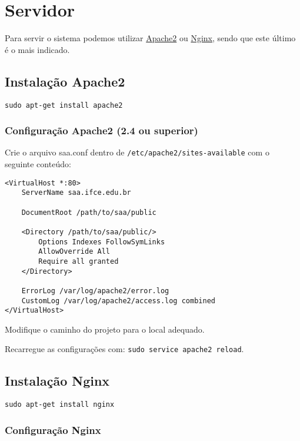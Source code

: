 \section{Servidor}\label{servidor}

Para servir o sistema podemos utilizar
\href{http://httpd.apache.org/}{Apache2} ou
\href{http://nginx.org/}{Nginx}, sendo que este último é o mais
indicado.

\subsection{Instalação Apache2}\label{instalauxe7uxe3o-apache2}

\begin{verbatim}
sudo apt-get install apache2
\end{verbatim}

\subsubsection{Configuração Apache2 (2.4 ou
superior)}\label{configurauxe7uxe3o-apache2-2.4-ou-superior}

Crie o arquivo saa.conf dentro de \texttt{/etc/apache2/sites-available}
com o seguinte conteúdo:

\begin{verbatim}
<VirtualHost *:80>
    ServerName saa.ifce.edu.br

    DocumentRoot /path/to/saa/public

    <Directory /path/to/saa/public/>
        Options Indexes FollowSymLinks
        AllowOverride All
        Require all granted
    </Directory>

    ErrorLog /var/log/apache2/error.log
    CustomLog /var/log/apache2/access.log combined
</VirtualHost>
\end{verbatim}

Modifique o caminho do projeto para o local adequado.

Recarregue as configurações com: \texttt{sudo service apache2 reload}.

\subsection{Instalação Nginx}\label{instalauxe7uxe3o-nginx}

\begin{verbatim}
sudo apt-get install nginx
\end{verbatim}

\subsubsection{Configuração Nginx}\label{configurauxe7uxe3o-nginx}

